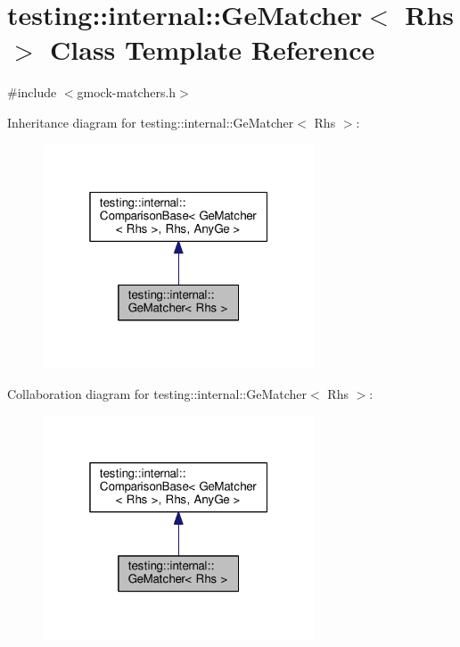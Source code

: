 \hypertarget{classtesting_1_1internal_1_1GeMatcher}{}\section{testing\+:\+:internal\+:\+:Ge\+Matcher$<$ Rhs $>$ Class Template Reference}
\label{classtesting_1_1internal_1_1GeMatcher}


{\ttfamily \#include $<$gmock-\/matchers.\+h$>$}



Inheritance diagram for testing\+:\+:internal\+:\+:Ge\+Matcher$<$ Rhs $>$\+:
\nopagebreak
\begin{figure}[H]
\begin{center}
\leavevmode
\includegraphics[width=229pt]{classtesting_1_1internal_1_1GeMatcher__inherit__graph}
\end{center}
\end{figure}


Collaboration diagram for testing\+:\+:internal\+:\+:Ge\+Matcher$<$ Rhs $>$\+:
\nopagebreak
\begin{figure}[H]
\begin{center}
\leavevmode
\includegraphics[width=229pt]{classtesting_1_1internal_1_1GeMatcher__coll__graph}
\end{center}
\end{figure}
